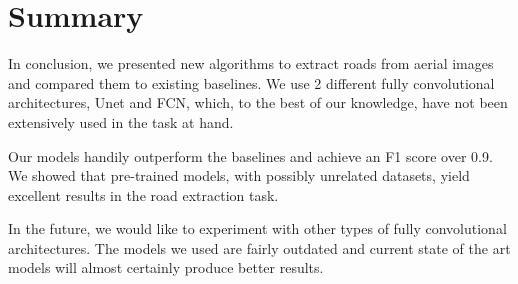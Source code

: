 \section{Summary}
In conclusion, we presented new algorithms to extract roads from aerial images and compared them to existing baselines. We use 2 different fully convolutional architectures, Unet and FCN, which, to the best of our knowledge, have not been extensively used in the task at hand.

Our models handily outperform the baselines and achieve an F1 score over 0.9. We showed that pre-trained models, with possibly unrelated datasets, yield excellent results in the road extraction task.

In the future, we would like to experiment with other types of fully convolutional architectures. The models we used are fairly outdated and current state of the art models will almost certainly produce better results.
